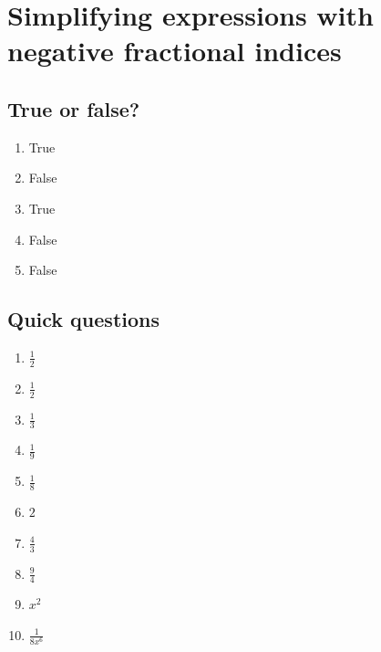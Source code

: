 \documentclass[11pt]{article}
\begin{document}
\section{Simplifying expressions with negative fractional indices}

\subsection*{True or false?}
\begin{enumerate}[label=\arabic*.]
\item True
\item False
\item True
\item False
\item False
\end{enumerate}

\subsection*{Quick questions}
\begin{enumerate}[label=\arabic*.]
\item \(\frac{1}{2}\)
\item \(\frac{1}{2}\)
\item \(\frac{1}{3}\)
\item \(\frac{1}{9}\)
\item \(\frac{1}{8}\)
\item \(2\)
\item \(\frac{4}{3}\)
\item \(\frac{9}{4}\)
\item \(x^2\)
\item \(\frac{1}{8x^6}\)
\end{enumerate}
\end{document}
